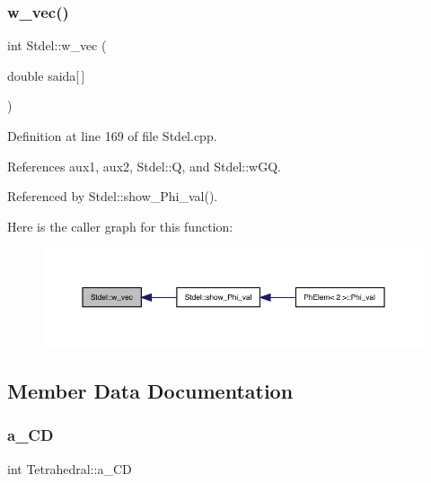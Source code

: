 \subsubsection{\texorpdfstring{w\+\_\+vec()}{w\_vec()}}
{\footnotesize\ttfamily int Stdel\+::w\+\_\+vec (\begin{DoxyParamCaption}\item[{double}]{saida\mbox{[}$\,$\mbox{]} }\end{DoxyParamCaption})\hspace{0.3cm}{\ttfamily [inherited]}}



Definition at line 169 of file Stdel.\+cpp.



References aux1, aux2, Stdel\+::Q, and Stdel\+::w\+GQ.



Referenced by Stdel\+::show\+\_\+\+Phi\+\_\+val().

Here is the caller graph for this function\+:
\nopagebreak
\begin{figure}[H]
\begin{center}
\leavevmode
\includegraphics[width=350pt]{classStdel_a395c8d7d7890a9efdea23932fa22b420_icgraph}
\end{center}
\end{figure}


\subsection{Member Data Documentation}
\mbox{\label{classTetrahedral_ae9100969833b3215945261766992c702}} 
\subsubsection{\texorpdfstring{a\+\_\+\+CD}{a\_CD}}
{\footnotesize\ttfamily int Tetrahedral\+::a\+\_\+\+CD\hspace{0.3cm}{\ttfamily [private]}}



